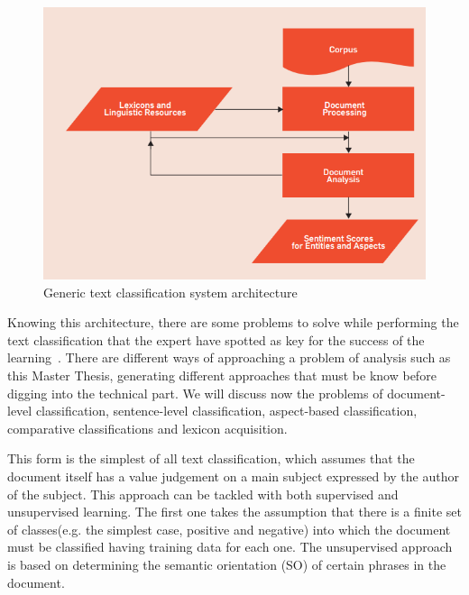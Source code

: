 \begin{figure}[!htp]
    \centering
    \includegraphics[scale=0.75]{img/state-of-art/text-classification-architecture.png}

    \caption{Generic text classification system architecture~\cite{feldman2013techniques}}
    \label{fig:text-clasification-architecture}
\end{figure}


Knowing this architecture, there are some problems to solve while performing the text classification that the expert have spotted as key for the success of the learning~\cite{feldman2013techniques}. There are different ways of approaching a problem of analysis such as this Master Thesis, generating different approaches that must be know before digging into the technical part. We will discuss now the problems of document-level classification, sentence-level classification, aspect-based classification, comparative classifications and lexicon acquisition.

This form is the simplest of all text classification, which assumes that the document itself has a value judgement on a main subject expressed by the author of the subject. This approach can be tackled with both supervised and unsupervised learning. The first one takes the assumption that there is a finite set of classes(e.g. the simplest case, positive and negative) into which the document must be classified having training data for each one. The unsupervised approach is based on determining the semantic orientation (SO) of certain phrases in the document.

